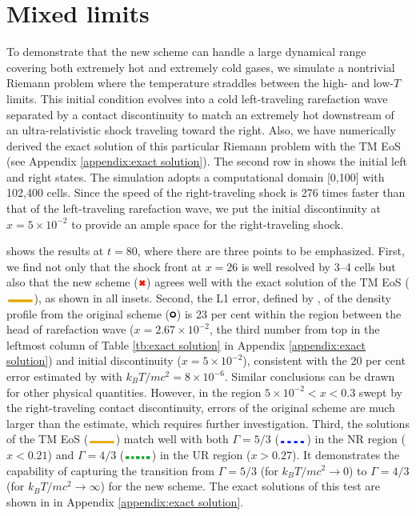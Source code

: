 \section{Mixed limits}
\label{section:NRLimit}
To demonstrate that the new scheme can handle a large dynamical range covering both extremely hot and extremely cold gases, we simulate a nontrivial Riemann problem where the temperature straddles between the high- and low-$T$ limits. This initial condition evolves into a cold left-traveling rarefaction wave separated by a contact discontinuity to match an extremely hot downstream of an ultra-relativistic shock traveling toward the right. Also, we have numerically derived the exact solution of this particular Riemann problem with the TM EoS (see Appendix \ref{appendix:exact solution}). The second row in  shows the initial left and right states. The simulation adopts a computational domain [0,100] with 102,400 cells. Since the speed of the right-traveling shock is 276 times faster than that of the left-traveling rarefaction wave, we put the initial discontinuity at $x=5\times10^{-2}$ to provide an ample space for the right-traveling shock.

 shows the results at $t=80$, where there are three points to be emphasized. First, we find not only that the shock front at $x=26$ is well resolved by 3--4 cells but also that the new scheme ($\MyCross[draw=MixedLimitsNew,fill=MixedLimitsNew]$) agrees well with the exact solution of the TM EoS ($\MySolidLine[draw=MixedLimitsExact,fill=MixedLimitsExact]$), as shown in all insets. Second, the L1 error, defined by , of the density profile from the original scheme ($\tikz\draw[MixedLimitsOri,fill=white,line width=1] (0,0) circle (.5ex);$) is 23 per cent within the region between the head of rarefaction wave ($x=2.67\times 10^{-2}$, the third number from top in the leftmost column of Table \ref{tb:exact solution} in Appendix \ref{appendix:exact solution}) and initial discontinuity ($x=5\times10^{-2}$), consistent with the 20 per cent error estimated by  with $k_{B}T/mc^2=8\times10^{-6}$. Similar conclusions can be drawn for other physical quantities. However, in the region $5\times10^{-2}<x<0.3$ swept by the right-traveling contact discontinuity, errors of the original scheme are much larger than the estimate, which requires further investigation. Third, the solutions of the TM EoS ($\MySolidLine[draw=MixedLimitsExact,fill=MixedLimitsExact]$) match well with both $\Gamma=5/3$ ($\MyDashedLine[draw=MixedLimitsExactNR,fill=MixedLimitsExactNR]$) in the NR region ($x<0.21$) and $\Gamma=4/3$ ($\MyDashedDottedLine[draw=MixedLimitsExactUR,fill=MixedLimitsExactUR]$) in the UR region ($x>0.27$). It demonstrates the capability of capturing the transition from $\Gamma=5/3$ (for $k_{B}T/mc^2 \rightarrow 0$) to $\Gamma=4/3$ (for $k_{B}T/mc^2 \rightarrow \infty$) for the new scheme. The exact solutions of this test are shown in  in Appendix \ref{appendix:exact solution}.

